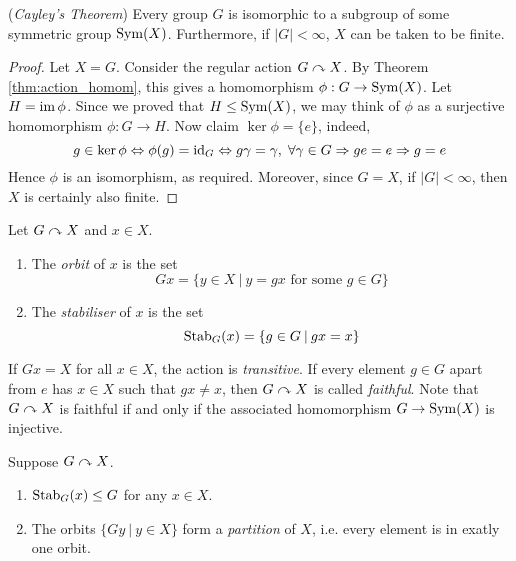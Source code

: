 \documentclass[10pt, a4paper, twoside]{report}
\begin{document}
\begin{theorem}
    (\emph{Cayley's Theorem}) Every group \(G\) is isomorphic to a subgroup of some symmetric group \(\operatorname{Sym}(X)\). Furthermore, if \(|G|<\infty\), \(X\) can be taken to be finite.
\end{theorem}
\begin{proof}
    Let \(X=G\). Consider the regular action \(G\curvearrowright X\). By Theorem \ref{thm:action_homom}, this gives a homomorphism \(\phi:G\to\operatorname{Sym}(X)\). Let \(H=\operatorname{im}\phi\). Since we proved that \(H\leq\operatorname{Sym}(X)\), we may think of \(\phi\) as a surjective homomorphism \(\phi:G\to H\). Now claim \(\ker\phi=\{e\}\), indeed,
    \[g\in\ker\phi\Leftrightarrow\phi(g)=\operatorname{id}_G\Leftrightarrow g\gamma=\gamma,\;\forall\gamma\in G\Rightarrow ge=e\Rightarrow g=e\]
    Hence \(\phi\) is an isomorphism, as required. Moreover, since \(G=X\), if \(|G|<\infty\), then \(X\) is certainly also finite.
\end{proof}
\begin{definition}
    Let \(G\curvearrowright X\) and \(x\in X\).
    \begin{enumerate}
        \item The \emph{orbit} of \(x\) is the set 
        \[Gx=\{y\in X\:|\:y=gx\text{  for some \(g\in G\)}\}\]
        \item The \emph{stabiliser} of \(x\) is the set
        \[\operatorname{Stab}_G(x)=\{g\in G\:|\:gx=x\}\]
    \end{enumerate}
\end{definition}
If \(Gx=X\) for all \(x\in X\), the action is \emph{transitive}. If every element \(g\in G\) apart from \(e\) has \(x\in X\) such that \(gx\neq x\), then \(G\curvearrowright X\) is called \emph{faithful}. Note that \(G\curvearrowright X\) is faithful if and only if the associated homomorphism \(G\to\operatorname{Sym}(X)\) is injective.
\begin{proposition}
    Suppose \(G\curvearrowright X\).
    \begin{enumerate}
        \item \(\operatorname{Stab}_G(x)\leq G\) for any \(x\in X\).
        \item The orbits \(\{Gy\:|\:y\in X\}\) form a \emph{partition} of \(X\), i.e. every element is in exatly one orbit.
    \end{enumerate}
    \label{prop:stab_orbit_prop}
\end{proposition}
\end{document}
